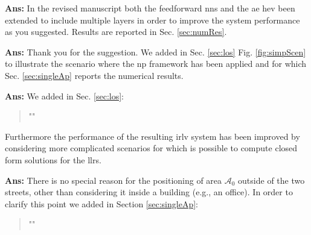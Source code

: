 \documentclass[draftcls,onecolumn,12pt]{IEEEtran}
\newcounter{revc}
\newcommand{\revp}[1]{\zref[revcontent]{#1}}
\begin{document}
{
\vspace{5mm} %
\begin{framed}
\end{framed}

{\bf Ans:} In the revised manuscript both the feedforward \acp{nn} and the \ac{ae} hev been extended to include multiple layers in order to improve the system performance as you suggested. Results are reported in Sec. \ref{sec:numRes}.

\vspace{5mm} %
\begin{framed}
\end{framed}

{\bf Ans:} Thank you for the suggestion. We added in Sec. \ref{sec:los} Fig. \ref{fig:simpScen} to illustrate the scenario where the \ac{np} framework has been applied and for which Sec. \ref{sec:singleAp} reports the numerical results.

\vspace{5mm} %
\begin{framed}
\end{framed}

{\bf Ans:} We added in Sec. \ref{sec:los}:
\begin{quote}
"\revp{llrComp}"
\end{quote}

Furthermore the performance of the resulting \ac{irlv} system has been improved by considering more complicated scenarios for which is possible to compute closed form solutions for the \acp{llr}.

\vspace{5mm} %
\begin{framed}
\end{framed}

{\bf Ans:} There is no special reason for the positioning of area $\mathcal A_0$ outside of the two streets, other than considering it inside a building (e.g., an office). In order to clarify this point we added in Section \ref{sec:singleAp}:
\begin{quote}
"\revp{building}"
\end{quote}

}
\end{document}
